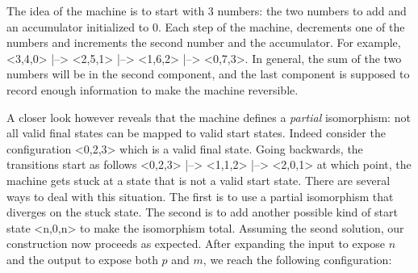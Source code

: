 \documentclass{llncs}
\begin{document}
The idea of the machine is to start with 3 numbers: the two numbers to add
and an accumulator initialized to 0. Each step of the machine, decrements one
of the numbers and increments the second number and the accumulator. For
example, {{<3,4,0> |--> <2,5,1> |--> <1,6,2> |--> <0,7,3>}}. In general, the
sum of the two numbers will be in the second component, and the last
component is supposed to record enough information to make the machine
reversible.

A closer look however reveals that the machine defines a \emph{partial}
isomorphism: not all valid final states can be mapped to valid start
states. Indeed consider the configuration {{<0,2,3>}} which is a valid final
state. Going backwards, the transitions start as follows 
{{<0,2,3> |--> <1,1,2> |--> <2,0,1>}} at which point, the machine gets stuck 
at a state that is not a valid start state.  There are several ways to deal with this
situation. The first is to use a partial isomorphism that diverges on the stuck state.
The second is to add another
possible kind of start state {{<n,0,n>}} to make the isomorphism total. 
Assuming the seond solution, our construction now proceeds as
expected. After expanding the input to expose $n$ and the output to expose
both $p$ and $m$, we reach the following configuration:




\end{document}
